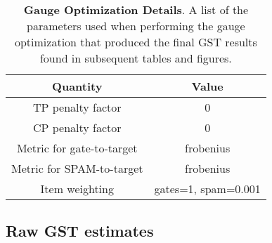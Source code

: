 \documentclass{article}[11pt]
\begin{document}
\begin{table}[h]
\begin{center}
\begin{tabular}[l]{|c|c|}
\hline
\textbf{Quantity} & \textbf{Value} \\ \hline
TP penalty factor & 0 \\ \hline
CP penalty factor & 0 \\ \hline
Metric for gate-to-target & frobenius \\ \hline
Metric for SPAM-to-target & frobenius \\ \hline
Item weighting & gates=1, spam=0.001 \\ \hline
\end{tabular}

\caption{\textbf{Gauge Optimization Details}.  A list of the parameters used when performing the gauge optimization that produced the final GST results found in subsequent tables and figures.\label{bestGatesetGaugeParamsTable}}
\end{center}
\end{table}


\subsection{Raw GST estimates}
\end{document}

